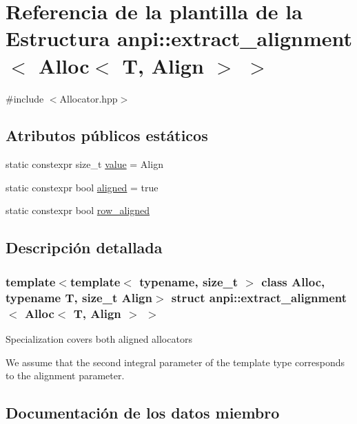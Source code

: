 \hypertarget{structanpi_1_1extract__alignment_3_01Alloc_3_01T_00_01Align_01_4_01_4}{}\section{Referencia de la plantilla de la Estructura anpi\+:\+:extract\+\_\+alignment$<$ Alloc$<$ T, Align $>$ $>$}
\label{structanpi_1_1extract__alignment_3_01Alloc_3_01T_00_01Align_01_4_01_4}


{\ttfamily \#include $<$Allocator.\+hpp$>$}

\subsection*{Atributos públicos estáticos}
\begin{DoxyCompactItemize}
\item 
static constexpr size\+\_\+t \hyperlink{structanpi_1_1extract__alignment_3_01Alloc_3_01T_00_01Align_01_4_01_4_a3bb91d789c6c831b2eae0780043c3bf8}{value} = Align
\item 
static constexpr bool \hyperlink{structanpi_1_1extract__alignment_3_01Alloc_3_01T_00_01Align_01_4_01_4_ab95bd1ca2b281ba457d80c9de368c2f2}{aligned} = true
\item 
static constexpr bool \hyperlink{structanpi_1_1extract__alignment_3_01Alloc_3_01T_00_01Align_01_4_01_4_ac5337014dfd1a6d908109b27bf9caacb}{row\+\_\+aligned}
\end{DoxyCompactItemize}


\subsection{Descripción detallada}
\subsubsection*{template$<$template$<$ typename, size\+\_\+t $>$ class Alloc, typename T, size\+\_\+t Align$>$\newline
struct anpi\+::extract\+\_\+alignment$<$ Alloc$<$ T, Align $>$ $>$}

Specialization covers both aligned allocators

We assume that the second integral parameter of the template type corresponds to the alignment parameter. 

\subsection{Documentación de los datos miembro}
\mbox{\label{structanpi_1_1extract__alignment_3_01Alloc_3_01T_00_01Align_01_4_01_4_ab95bd1ca2b281ba457d80c9de368c2f2}} 
